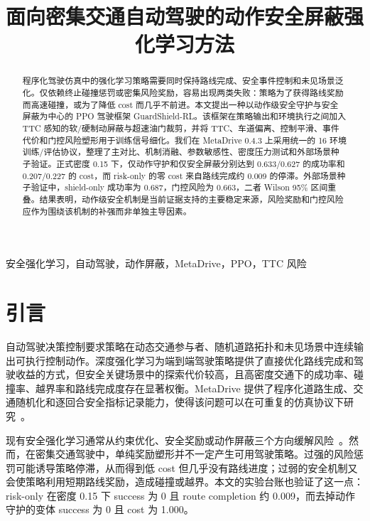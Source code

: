 \documentclass[conference,a4paper]{IEEEtran}
\title{面向密集交通自动驾驶的动作安全屏蔽强化学习方法}
\author{\IEEEauthorblockN{作者姓名}
\IEEEauthorblockA{单位名称\\电子邮箱}}
\newcommand{\method}{GuardShield-RL}
\begin{document}
\maketitle

\begin{abstract}
程序化驾驶仿真中的强化学习策略需要同时保持路线完成、安全事件控制和未见场景泛化。仅依赖终止碰撞惩罚或密集风险奖励，容易出现两类失败：策略为了获得路线奖励而高速碰撞，或为了降低 cost 而几乎不前进。本文提出一种以动作级安全守护与安全屏蔽为中心的 PPO 驾驶框架 \method{}。该框架在策略输出和环境执行之间加入 TTC 感知的软/硬制动屏蔽与超速油门裁剪，并将 TTC、车道偏离、控制平滑、事件代价和门控风险塑形用于训练信号细化。我们在 MetaDrive 0.4.3 上采用统一的 16 环境训练/评估协议，整理了主对比、机制消融、参数敏感性、密度压力测试和外部场景种子验证。正式密度 0.15 下，仅动作守护和仅安全屏蔽分别达到 0.633/0.627 的成功率和 0.207/0.227 的 cost，而 risk-only 的零 cost 来自路线完成约 0.009 的停滞。外部场景种子验证中，shield-only 成功率为 0.687，门控风险为 0.663，二者 Wilson 95\% 区间重叠。结果表明，动作级安全机制是当前证据支持的主要稳定来源，风险奖励和门控风险应作为围绕该机制的补强而非单独主导因素。
\end{abstract}

\begin{IEEEkeywords}
安全强化学习，自动驾驶，动作屏蔽，MetaDrive，PPO，TTC 风险
\end{IEEEkeywords}

\section{引言}
自动驾驶决策控制要求策略在动态交通参与者、随机道路拓扑和未见场景中连续输出可执行控制动作。深度强化学习为端到端驾驶策略提供了直接优化路线完成和驾驶收益的方式，但安全关键场景中的探索代价较高，且高密度交通下的成功率、碰撞率、越界率和路线完成度存在显著权衡。MetaDrive 提供了程序化道路生成、交通随机化和逐回合安全指标记录能力，使得该问题可以在可重复的仿真协议下研究~\cite{li2022metadrive}。

现有安全强化学习通常从约束优化、安全奖励或动作屏蔽三个方向缓解风险~\cite{garcia2015safe,achiam2017cpo,alshiekh2018shielding,cheng2019barrier}。然而，在密集交通驾驶中，单纯奖励塑形并不一定产生可用驾驶策略。过强的风险惩罚可能诱导策略停滞，从而得到低 cost 但几乎没有路线进度；过弱的安全机制又会使策略利用短期路线奖励，造成碰撞或越界。本文的实验台账也验证了这一点：risk-only 在密度 0.15 下 success 为 0 且 route completion 约 0.009，而去掉动作守护的变体 success 为 0 且 cost 为 1.000。
\end{document}
